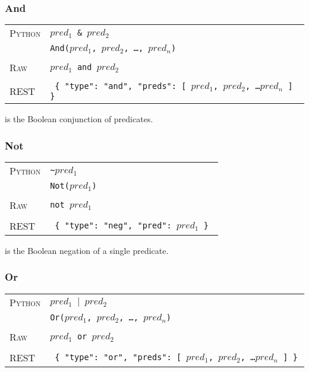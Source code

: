 \subsubsection{And}

\bigskip
\begin{tabularx}{\linewidth}{lX}
\textsc{Python}   & \texttt{$pred_1$ \& $pred_2$} \\
    & \texttt{And($pred_1$, $pred_2$, \ldots, $pred_n$)} \\ \\
\textsc{Raw}    & \texttt{$pred_1$ and $pred_2$}  \\ \\
\textsc{REST} & \texttt{ \{ "type": "and", "preds": [ $pred_1$, $pred_2$, \ldots $pred_n$ ] \} } 
\end{tabularx}

 is the Boolean conjunction of predicates. 

\subsubsection{Not}

\bigskip
\begin{tabularx}{\linewidth}{lX}
\textsc{Python}   & \texttt{\textasciitilde $pred_1$} \\
    & \texttt{Not($pred_1$)} \\ \\
\textsc{Raw}    & \texttt{not $pred_1$}  \\ \\
\textsc{REST} & \texttt{ \{ "type": "neg", "pred": $pred_1$ \} } 
\end{tabularx}

 is the Boolean negation of a single predicate.

\subsubsection{Or}

\bigskip
\begin{tabularx}{\linewidth}{lX}
\textsc{Python}   & \texttt{$pred_1$ $\vert$ $pred_2$} \\
    & \texttt{Or($pred_1$, $pred_2$, \ldots, $pred_n$)} \\ \\
\textsc{Raw}    & \texttt{$pred_1$ or $pred_2$}  \\ \\
\textsc{REST} & \texttt{ \{ "type": "or", "preds": [ $pred_1$, $pred_2$, \ldots $pred_n$ ] \} } \end{tabularx}

